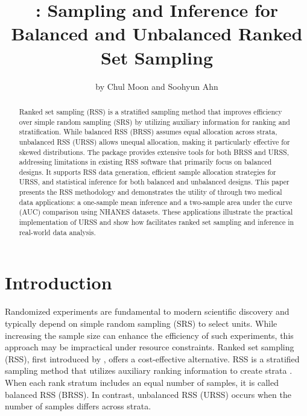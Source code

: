 \title{: Sampling and Inference for Balanced and Unbalanced Ranked Set Sampling}
\author{by Chul Moon and Soohyun Ahn}

\maketitle
\begin{abstract}
Ranked set sampling (RSS) is a stratified sampling method that improves efficiency over simple random sampling (SRS) by utilizing auxiliary information for ranking and stratification. While balanced RSS (BRSS) assumes equal allocation across strata, unbalanced RSS (URSS) allows unequal allocation, making it particularly effective for skewed distributions. The  package provides extensive tools for both BRSS and URSS, addressing limitations in existing RSS software that primarily focus on balanced designs. It supports RSS data generation, efficient sample allocation strategies for URSS, and statistical inference for both balanced and unbalanced designs. This paper presents the RSS methodology and demonstrates the utility of  through two medical data applications: a one-sample mean inference and a two-sample area under the curve (AUC) comparison using NHANES datasets. These applications illustrate the practical implementation of URSS and show how  facilitates ranked set sampling and inference in real-world data analysis.
\end{abstract}

\section[Introduction]{Introduction} \label{sec:intro}

Randomized experiments are fundamental to modern scientific discovery and typically depend on simple random sampling (SRS) to select units. While increasing the sample size can enhance the efficiency of such experiments, this approach may be impractical under resource constraints. Ranked set sampling (RSS), first introduced by \cite{mcintyre1952method}, offers a cost-effective alternative. RSS is a stratified sampling method that utilizes auxiliary ranking information to create strata \citep{StokesS:1988}. When each rank stratum includes an equal number of samples, it is called balanced RSS (BRSS). In contrast, unbalanced RSS (URSS) occurs when the number of samples differs across strata. 


